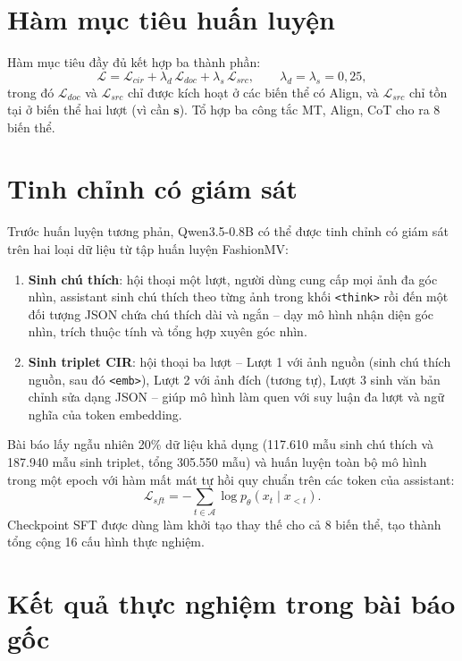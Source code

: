 \section{Hàm mục tiêu huấn luyện}\label{sec:procir-objective}

Hàm mục tiêu đầy đủ kết hợp ba thành phần:
\begin{equation}
    \mathcal{L} = \mathcal{L}_{cir} + \lambda_d\,\mathcal{L}_{doc} + \lambda_s\,\mathcal{L}_{src}, \qquad \lambda_d = \lambda_s = 0{,}25,
    \label{eq:procir-loss}
\end{equation}
trong đó $\mathcal{L}_{doc}$ và $\mathcal{L}_{src}$ chỉ được kích hoạt ở các biến thể có Align, và $\mathcal{L}_{src}$ chỉ tồn tại ở biến thể hai lượt (vì cần $\mathbf{s}$). Tổ hợp ba công tắc MT, Align, CoT cho ra 8 biến thể.

\section{Tinh chỉnh có giám sát}\label{sec:procir-sft}

Trước huấn luyện tương phản, Qwen3.5-0.8B có thể được tinh chỉnh có giám sát trên hai loại dữ liệu từ tập huấn luyện FashionMV:
\begin{enumerate}
    \item \textbf{Sinh chú thích}: hội thoại một lượt, người dùng cung cấp mọi ảnh đa góc nhìn, assistant sinh chú thích theo từng ảnh trong khối \texttt{<think>} rồi đến một đối tượng JSON chứa chú thích dài và ngắn -- dạy mô hình nhận diện góc nhìn, trích thuộc tính và tổng hợp xuyên góc nhìn.
    \item \textbf{Sinh triplet CIR}: hội thoại ba lượt -- Lượt 1 với ảnh nguồn (sinh chú thích nguồn, sau đó \texttt{<emb>}), Lượt 2 với ảnh đích (tương tự), Lượt 3 sinh văn bản chỉnh sửa dạng JSON -- giúp mô hình làm quen với suy luận đa lượt và ngữ nghĩa của token embedding.
\end{enumerate}
Bài báo lấy ngẫu nhiên 20\% dữ liệu khả dụng (117.610 mẫu sinh chú thích và 187.940 mẫu sinh triplet, tổng 305.550 mẫu) và huấn luyện toàn bộ mô hình trong một epoch với hàm mất mát tự hồi quy chuẩn trên các token của assistant:
\begin{equation}
    \mathcal{L}_{sft} = -\sum_{t \in \mathcal{A}} \log p_\theta(x_t \mid x_{<t}).
\end{equation}
Checkpoint SFT được dùng làm khởi tạo thay thế cho cả 8 biến thể, tạo thành tổng cộng 16 cấu hình thực nghiệm.

\section{Kết quả thực nghiệm trong bài báo gốc}\label{sec:paper-results}

